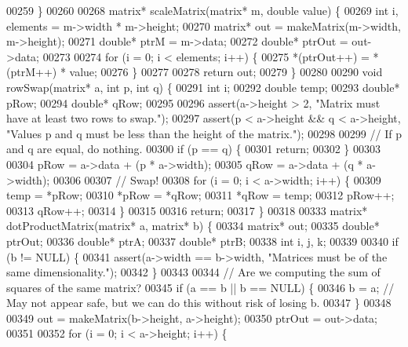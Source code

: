\begin{DoxyCode}
{{{00259 \}
00260 
00268 matrix* scaleMatrix(matrix* m, \textcolor{keywordtype}{double} value) \{
00269     \textcolor{keywordtype}{int} i, elements = m->width * m->height;
00270     matrix* out = makeMatrix(m->width, m->height);
00271     \textcolor{keywordtype}{double}* ptrM = m->data;
00272     \textcolor{keywordtype}{double}* ptrOut = out->data;
00273 
00274     \textcolor{keywordflow}{for} (i = 0; i < elements; i++) \{
00275         *(ptrOut++) = *(ptrM++) * value;
00276     \}
00277 
00278     \textcolor{keywordflow}{return} out;
00279 \}
00280 
00290 \textcolor{keywordtype}{void} rowSwap(matrix* a, \textcolor{keywordtype}{int} p, \textcolor{keywordtype}{int} q) \{
00291     \textcolor{keywordtype}{int} i;
00292     \textcolor{keywordtype}{double} temp;
00293     \textcolor{keywordtype}{double}* pRow;
00294     \textcolor{keywordtype}{double}* qRow;
00295 
00296     assert(a->height > 2, \textcolor{stringliteral}{"Matrix must have at least two rows to swap."});
00297     assert(p < a->height && q < a->height, \textcolor{stringliteral}{"Values p and q must be less than the height of the matrix."});
00298 
00299     \textcolor{comment}{// If p and q are equal, do nothing.}
00300     \textcolor{keywordflow}{if} (p == q) \{
00301         \textcolor{keywordflow}{return};
00302     \}
00303 
00304     pRow = a->data + (p * a->width);
00305     qRow = a->data + (q * a->width);
00306 
00307     \textcolor{comment}{// Swap!}
00308     \textcolor{keywordflow}{for} (i = 0; i < a->width; i++) \{
00309         temp = *pRow;
00310         *pRow = *qRow;
00311         *qRow = temp;
00312         pRow++;
00313         qRow++;
00314     \}
00315 
00316     \textcolor{keywordflow}{return};
00317 \}
00318 
00333 matrix* dotProductMatrix(matrix* a, matrix* b) \{
00334     matrix* out;
00335     \textcolor{keywordtype}{double}* ptrOut;
00336     \textcolor{keywordtype}{double}* ptrA;
00337     \textcolor{keywordtype}{double}* ptrB;
00338     \textcolor{keywordtype}{int} i, j, k;
00339 
00340     \textcolor{keywordflow}{if} (b != NULL) \{
00341         assert(a->width == b->width, \textcolor{stringliteral}{"Matrices must be of the same dimensionality."});
00342     \}
00343 
00344     \textcolor{comment}{// Are we computing the sum of squares of the same matrix?}
00345     \textcolor{keywordflow}{if} (a == b || b == NULL) \{
00346         b = a; \textcolor{comment}{// May not appear safe, but we can do this without risk of losing b.}
00347     \}
00348 
00349     out = makeMatrix(b->height, a->height);
00350     ptrOut = out->data;
00351 
00352     \textcolor{keywordflow}{for} (i = 0; i < a->height; i++) \{
}}}
\end{DoxyCode}
